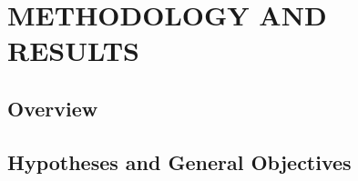 \chapter{METHODOLOGY AND RESULTS}
\label{ch:methodology-results}




\section{Overview}




\section{Hypotheses and General Objectives}





